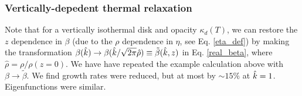 \subsubsection{Vertically-depedent thermal relaxation} 
Note that for a vertically isothermal disk and opacity $\kappa_d(T)$, 
we can restore the $z$ dependence in $\beta$ (due to the $\rho$
dependence in  $\eta$, see Eq. \ref{eta_def}) by making the transformation
$\beta(\hat{k})\to\beta(\hat{k}/\sqrt{2\pi}\hat{\rho})\equiv 
\tilde{\beta}(\hat{k},z)$ in  Eq. \ref{real_beta}, where
$\hat{\rho}=\rho/\rho(z=0)$.  We have have repeated the example
calculation above with $\beta\to\tilde{\beta}$. We find growth rates
were reduced, but at most by $\sim 15\%$ at $\hat{k}=1$. Eigenfunctions
were similar.  


